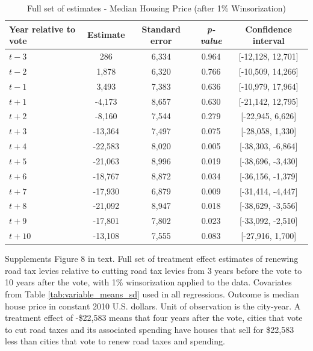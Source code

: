 \begin{table}[htbp]
    \centering
    \caption{Full set of estimates - Median Housing Price (after 1\% Winsorization)}
    \label{tab:median_sale_amount_winsorized}
    \begin{tabular}{p{3cm}cccc}
        \hline
        \textbf{Year relative to vote} & \textbf{Estimate} & \textbf{Standard error} & \textbf{\textit{p-value}} & \textbf{Confidence interval} \\
        \hline
        $t - 3$  & 286     & 6,334  & 0.964  & [-12,128, 12,701] \\
        $t - 2$  & 1,878   & 6,320  & 0.766  & [-10,509, 14,266] \\
        $t - 1$  & 3,493   & 7,383  & 0.636  & [-10,979, 17,964] \\
        $t + 1$  & -4,173  & 8,657  & 0.630  & [-21,142, 12,795] \\
        $t + 2$  & -8,160  & 7,544  & 0.279  & [-22,945, 6,626] \\
        $t + 3$  & -13,364 & 7,497  & 0.075  & [-28,058, 1,330] \\
        $t + 4$  & -22,583 & 8,020  & 0.005  & [-38,303, -6,864] \\
        $t + 5$  & -21,063 & 8,996  & 0.019  & [-38,696, -3,430] \\
        $t + 6$  & -18,767 & 8,872  & 0.034  & [-36,156, -1,379] \\
        $t + 7$  & -17,930 & 6,879  & 0.009  & [-31,414, -4,447] \\
        $t + 8$  & -21,092 & 8,947  & 0.018  & [-38,629, -3,556] \\
        $t + 9$  & -17,801 & 7,802  & 0.023  & [-33,092, -2,510] \\
        $t + 10$ & -13,108 & 7,555  & 0.083  & [-27,916, 1,700] \\
        \hline
    \end{tabular}
    \begin{tablenotes}
        \small
        \item Supplements Figure 8 in text. Full set of treatment effect estimates of renewing road tax levies relative to cutting road tax levies from 3 years before the vote to 10 years after the vote, with 1\% winsorization applied to the data. Covariates from Table \ref{tab:variable_means_sd} used in all regressions. Outcome is median house price in constant 2010 U.S. dollars. Unit of observation is the city-year. A treatment effect of -\$22,583 means that four years after the vote, cities that vote to cut road taxes and its associated spending have houses that sell for \$22,583 less than cities that vote to renew road taxes and spending.
    \end{tablenotes}
\end{table}


